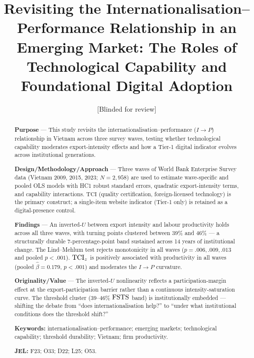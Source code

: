 \documentclass[12pt,a4paper]{article}
\title{Revisiting the Internationalisation--Performance Relationship in an
  Emerging Market: The Roles of Technological Capability and Foundational
  Digital Adoption}
\author{[Blinded for review]}
\date{}
\begin{document}
\maketitle

\begin{abstract}
\noindent\textbf{Purpose} --- This study revisits the
internationalisation--performance (\(I \to P\)) relationship in Vietnam across
three survey waves, testing whether technological capability moderates
export-intensity effects and how a Tier-1 digital indicator evolves across
institutional generations.

\medskip
\noindent\textbf{Design/Methodology/Approach} --- Three waves of World Bank
Enterprise Survey data (Vietnam 2009, 2015, 2023; \(N = 2{,}958\)) are used to
estimate wave-specific and pooled OLS models with HC1 robust standard errors,
quadratic export-intensity terms, and capability interactions.
\(\mathrm{TCI}\) (quality certification, foreign-licensed technology) is the
primary construct; a single-item website indicator (Tier-1 only) is retained
as a digital-presence control.

\medskip
\noindent\textbf{Findings} --- An inverted-\(U\) between export intensity and
labour productivity holds across all three waves, with turning points clustered
between 39\% and 46\% --- a structurally durable 7-percentage-point band
sustained across 14 years of institutional change.  The Lind--Mehlum test
rejects monotonicity in all waves (\(p = .006, .009, .013\) and pooled
\(p < .001\)).  \({\mathrm{TCI}_{z}}\) is positively associated with productivity in all
waves (pooled \(\hat{\beta} = 0.179\), \(p < .001\)) and moderates the \(I
\to P\) curvature.

\medskip
\noindent\textbf{Originality/Value} --- The inverted-\(U\) nonlinearity
reflects a participation-margin effect at the export-participation barrier
rather than a continuous intensity-saturation curve.  The threshold cluster
(39--46\% \({\mathrm{FSTS}}\) band) is institutionally embedded --- shifting the debate
from ``does internationalisation help?'' to ``under what institutional
conditions does the threshold shift?''

\medskip
\noindent\textbf{Keywords:} internationalisation--performance; emerging
markets; technological capability; threshold durability; Vietnam; firm
productivity.

\medskip
\noindent\textbf{JEL:} F23; O33; D22; L25; O53.
\end{abstract}

\newpage
\end{document}
